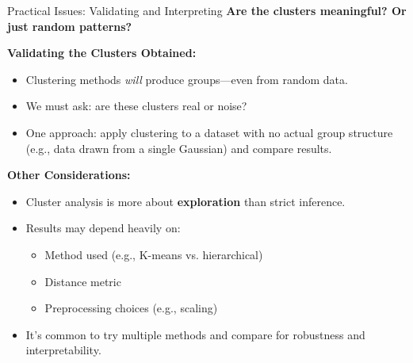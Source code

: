 \documentclass[aspectratio=169,xcolor=dvipsnames]{beamer}
\begin{document}
\begin{frame}{Practical Issues: Validating and Interpreting}
  \textbf{Are the clusters meaningful? Or just random patterns?}

  \vspace{0.3cm}
  \textbf{Validating the Clusters Obtained:}
  \begin{itemize}
    \item Clustering methods \textit{will} produce groups—even from random data.
    \item We must ask: are these clusters real or noise?
    \item One approach: apply clustering to a dataset with no actual group structure (e.g., data drawn from a single Gaussian) and compare results.
  \end{itemize}

  \vspace{0.3cm}
  \textbf{Other Considerations:}
  \begin{itemize}
    \item Cluster analysis is more about \textbf{exploration} than strict inference.
    \item Results may depend heavily on:
    \begin{itemize}
      \item Method used (e.g., K-means vs. hierarchical)
      \item Distance metric
      \item Preprocessing choices (e.g., scaling)
    \end{itemize}
    \item It's common to try multiple methods and compare for robustness and interpretability.
  \end{itemize}
\end{frame}
\end{document}
